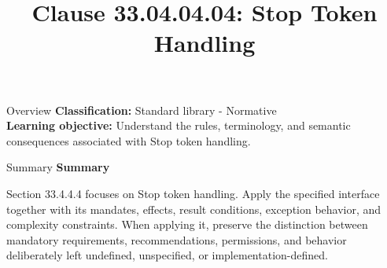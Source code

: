 \documentclass[10pt,letterpaper]{article}
\title{Clause 33.04.04.04: Stop Token Handling}
\author{}
\date{}
\begin{document}
\maketitle
\begin{CornellOverviewBox}{Overview}
\textbf{Classification:} Standard library - Normative\\[2pt]
\textbf{Learning objective:} Understand the rules, terminology, and semantic consequences associated with Stop token handling.
\end{CornellOverviewBox}\begin{CornellSummaryBox}{Summary}
{\sffamily\bfseries\color{Accent} Summary}\par\vspace{3pt}Section 33.4.4.4 focuses on Stop token handling. Apply the specified interface together with its mandates, effects, result conditions, exception behavior, and complexity constraints. When applying it, preserve the distinction between mandatory requirements, recommendations, permissions, and behavior deliberately left undefined, unspecified, or implementation-defined.
\end{CornellSummaryBox}
\end{document}
